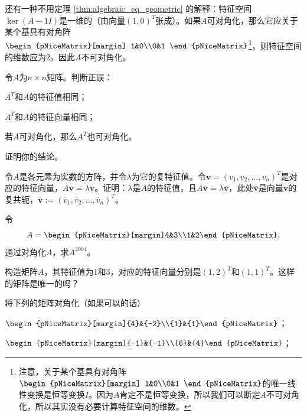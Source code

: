 还有一种不用定理 \ref{thm:algebraic_eq_geometric} 的解释：特征空间$\ker(A-1I)$是一维的（由向量$(1,0)^T$张成）。如果$A$可对角化，那么它应关于某个基具有对角阵$\begin{pNiceMatrix}[margin]
    1&0\\0&1
\end{pNiceMatrix}$\footnote{注意，关于某个基具有对角阵$\begin{pNiceMatrix}[margin]
    1&0\\0&1
\end{pNiceMatrix}$的唯一线性变换是恒等变换$I$。因为$A$肯定不是恒等变换，所以我们可以断定$A$不可对角化，所以其实没有必要计算特征空间的维数。}，则特征空间的维数应为$2$。因此$A$不可对角化。
\pagebreak
\begin{problemset}
    \item 令$A$为$n\times n$矩阵。判断正误：
    \begin{probenumerate}
        \item $A^T$和$A$的特征值相同；
        \item $A^T$和$A$的特征向量相同；
        \item 若$A$可对角化，那么$A^T$也可对角化。
    \end{probenumerate}
    证明你的结论。
    \item \label{ex:4_2_2} 令$A$是各元素为实数的方阵，并令$\lambda$为它的复特征值。令$\mathbf{v}=(v_{1},v_{2},\ldots,v_{n})^{T}$是对应的特征向量，$A\mathbf{v}=\lambda\mathbf{v}$。证明：$\overline{\lambda}$是$A$的特征值，且$A\mathbf{\overline{v}}=\overline{\lambda}\mathbf{\overline{v}}$，此处$\mathbf{\overline{v}}$是向量$\mathbf{v}$的复共轭，${\overline{\mathbf{v}}}:=({\overline{v}}_{1},{\overline{v}}_{2},\ldots,{\overline{v}}_{n})^{T}$。
    \item 令\[A=\begin{pNiceMatrix}[margin]4&3\\1&2\end{pNiceMatrix}.\]通过对角化$A$，求$A^{2004}$。
    \item 构造矩阵$A$，其特征值为$1$和$3$，对应的特征向量分别是$(1,2)^T$和$(1,1)^T$。这样的矩阵是唯一的吗？
    \item 将下列的矩阵对角化（如果可以的话）
    \begin{probenumerate}
        \item $\begin{pNiceMatrix}[margin]{4}&{-2}\\{1}&{1}\end{pNiceMatrix}$；
        \item $\begin{pNiceMatrix}[margin]{-1}&{-1}\\{6}&{4}\end{pNiceMatrix}$；

\end{probenumerate}
\end{problemset}
